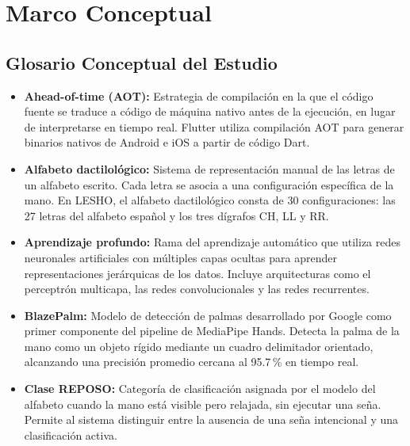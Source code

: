 \chapter[Marco Conceptual]{Marco Conceptual}
\label{ch:marco-conceptual}

\clearpage

\section{Glosario Conceptual del Estudio}

\begin{itemize}
    \item[] \textbf{Ahead-of-time (AOT):} Estrategia de compilación en la que el código fuente se traduce a código de máquina nativo antes de la ejecución, en lugar de interpretarse en tiempo real. Flutter utiliza compilación AOT para generar binarios nativos de Android e iOS a partir de código Dart.\\

    \item[] \textbf{Alfabeto dactilológico:} Sistema de representación manual de las letras de un alfabeto escrito. Cada letra se asocia a una configuración específica de la mano. En LESHO, el alfabeto dactilológico consta de 30 configuraciones: las 27 letras del alfabeto español y los tres dígrafos CH, LL y RR.\\

    \item[] \textbf{Aprendizaje profundo:} Rama del aprendizaje automático que utiliza redes neuronales artificiales con múltiples capas ocultas para aprender representaciones jerárquicas de los datos. Incluye arquitecturas como el perceptrón multicapa, las redes convolucionales y las redes recurrentes.\\

    \item[] \textbf{BlazePalm:} Modelo de detección de palmas desarrollado por Google como primer componente del pipeline de MediaPipe Hands. Detecta la palma de la mano como un objeto rígido mediante un cuadro delimitador orientado, alcanzando una precisión promedio cercana al 95.7\,\% en tiempo real.\\

    \item[] \textbf{Clase REPOSO:} Categoría de clasificación asignada por el modelo del alfabeto cuando la mano está visible pero relajada, sin ejecutar una seña. Permite al sistema distinguir entre la ausencia de una seña intencional y una clasificación activa.\\


\end{itemize}
